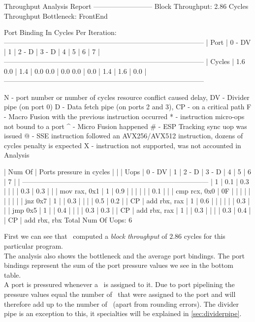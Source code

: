 \begin{example}
Throughput Analysis Report
--------------------------
Block Throughput: 2.86 Cycles       Throughput Bottleneck: FrontEnd

Port Binding In Cycles Per Iteration:
---------------------------------------------------------------------------------------
|  Port  |  0   -  DV  |  1   |  2   -  D   |  3   -  D   |  4   |  5   |  6   |  7   |
---------------------------------------------------------------------------------------
| Cycles | 1.6    0.0  | 1.4  | 0.0    0.0  | 0.0    0.0  | 0.0  | 1.4  | 1.6  | 0.0  |
---------------------------------------------------------------------------------------

N - port number or number of cycles resource conflict caused delay, DV - Divider pipe (on port 0)
D - Data fetch pipe (on ports 2 and 3), CP - on a critical path
F - Macro Fusion with the previous instruction occurred
* - instruction micro-ops not bound to a port
^ - Micro Fusion happened
# - ESP Tracking sync uop was issued
@ - SSE instruction followed an AVX256/AVX512 instruction, dozens of cycles penalty is expected
X - instruction not supported, was not accounted in Analysis

| Num Of |                    Ports pressure in cycles                     |    |
|  Uops  |  0  - DV  |  1  |  2  -  D  |  3  -  D  |  4  |  5  |  6  |  7  |    |
---------------------------------------------------------------------------------
|   1    | 0.1       | 0.3 |           |           |     | 0.3 | 0.3 |     |    | mov rax, 0x1
|   1    | 0.9       |     |           |           |     |     | 0.1 |     |    | cmp rcx, 0x0
|   0F   |           |     |           |           |     |     |     |     |    | jnz 0x7
|   1    |           | 0.3 |           |           |     | 0.5 | 0.2 |     | CP | add rbx, rax
|   1    | 0.6       |     |           |           |     |     | 0.3 |     |    | jmp 0x5
|   1    |           | 0.4 |           |           |     | 0.3 | 0.3 |     | CP | add rbx, rax
|   1    |           | 0.3 |           |           |     | 0.3 | 0.4 |     | CP | add rbx, rbx
Total Num Of Uops: 6
\end{example}

First we can see that \iaca\ computed a \emph{block throughput} of $2.86$ cycles for this particular program.\\
The analysis also shows the bottleneck and the average port bindings. The port bindings represent the sum of the port pressure values we see in the bottom table.\\
A port is pressured whenever a \microop\ is assigned to it. Due to port pipelining the pressure values equal the number of \microops\ that were assigned to the port and will therefore add up to the number of \microops\ (apart from rounding errors). The divider pipe is an exception to this, it specialties will be explained in \autoref{sec:dividerpipe}.
 

